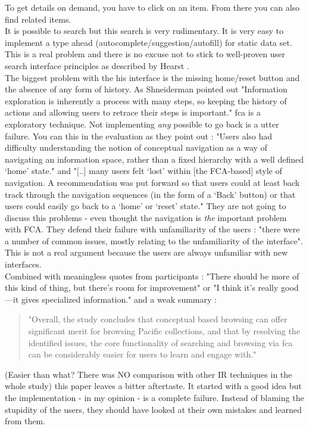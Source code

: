 \documentclass[11pt]{report}
\begin{document}
{{ To get details on demand, you have to click on an item. From there you can also find related items. \\
 
 It is possible to search but this search is very rudimentary. It is very easy to implement a type ahead (autocomplete/suggestion/autofill) for static data set. This is a real problem and there is no excuse not to stick to well-proven user search interface principles as described by Hearst \cite{Hearst2009}. \\
 
 The biggest problem with the his interface is the missing home/reset button and the absence of any form of history. As Shneiderman \cite{Shneiderman1996} pointed out "Information exploration is inherently a process with many steps, so keeping the history of actions and allowing users to retrace their steps is important." \acrshort{fca} is a exploratory technique. Not implementing \textit{any} possible to go back is a utter failure. You can this in the evaluation as they point out \cite{Eklund2012}: "Users also had difficulty understanding the notion of conceptual navigation as a way of navigating an information space, rather than a fixed hierarchy with a well defined ‘home’ state." and "[..] many users felt ‘lost’ within [the FCA-based] style of navigation. A recommendation was put forward so that users could at least back track through the navigation sequences (in the form of a ‘Back’ button) or that users could easily go back to a ‘home’ or ‘reset’ state." They are not going to discuss this problems - even thought the navigation is \textit{the} important problem with FCA. They defend their failure with unfamiliarity of the users \cite{Eklund2012}: "there were a number of common issues, mostly relating to the unfamiliarity of the interface". This is not a real argument because the users are always unfamiliar with new interfaces. \\
 
  Combined with meaningless quotes from participants \cite{Eklund2012} : "There should be more of this kind of thing, but there’s room for improvement" or "I think it’s really good—it gives specialized information." and a weak summary \cite{Eklund2012}:
  \begin{quote}
  "Overall, the study concludes that conceptual based browsing can offer significant merit for browsing Pacific collections, and that by resolving the identified issues, the core functionality of searching and browsing via \acrshort{fca} can be considerably easier for users to learn and engage with." 
  \end{quote}
  (Easier than what? There was NO comparison with other IR techniques in the whole study) this paper leaves a bitter aftertaste. It started with a good idea but the implementation - in my opinion - is a complete failure. Instead of blaming the stupidity of the users, they should have looked at their own mistakes and learned from them.\\
 
}}
\end{document}
